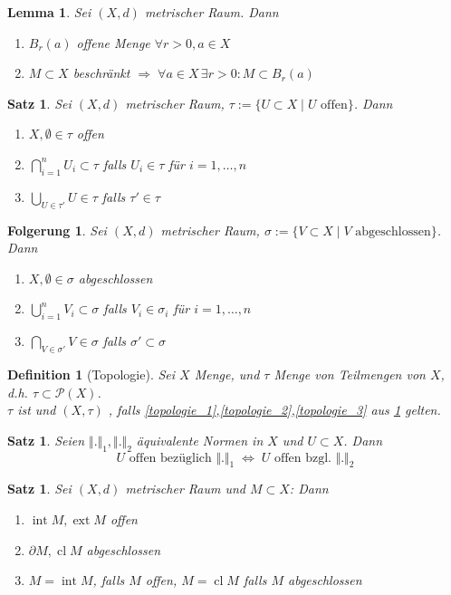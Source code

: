 \documentclass[ngerman,a4paper]{report}
\theoremstyle{break}
\newtheorem{lemma}[theorem]{Lemma}
\newtheorem{satz}[theorem]{Satz}
\newtheorem*{definition}{Definition}
\newtheorem{conclusion}[theorem]{Folgerung}
\DeclareMathOperator{\Int}{int}
\DeclareMathOperator{\Ext}{ext}
\DeclareMathOperator{\cl}{cl}
\begin{document}
\begin{lemma}
	Sei $(X,d)$ metrischer Raum. Dann
	\begin{enumerate}[label={\arabic*)}]
		\item $B_r(a)$ offene Menge $\forall r>0,a\in X$
		\item $M\subset X$ beschränkt $\Rightarrow\; \forall a\in X\,\exists r>0: M\subset B_r(a)$
	\end{enumerate}
\end{lemma}

\begin{satz}\label{satz_topologie}
	Sei $(X,d)$ metrischer Raum, $\tau:=\{U\subset X \mid U \text{ offen}\}$. Dann
	\begin{enumerate}[label={\arabic*)}]
		\item \label{topologie_1} $X,\emptyset\in \tau$ offen
		\item \label{topologie_2} $\bigcap_{i=1}^n U_i\subset \tau$ falls $U_i\in\tau$ für $i=1,\dotsc,n$
		\item \label{topologie_3} $\bigcup_{U\in\tau'} U\in\tau$ falls $\tau'\in\tau$ 
	\end{enumerate}
\end{satz}
\begin{conclusion}
	Sei $(X,d)$ metrischer Raum, $\sigma :=\{ V\subset X \mid  V \text{ abgeschlossen}\}$. Dann
	\begin{enumerate}[label={\arabic*)}]
		\item $X,\emptyset \in \sigma$ abgeschlossen
		\item $\bigcup_{i=1}^n V_i\subset\sigma$ falls $V_i\in\sigma_i$ für $i=1,\dotsc, n$
		\item $\bigcap_{V\in\sigma'} V\in\sigma$ falls $\sigma'\subset\sigma$
	\end{enumerate}
\end{conclusion}

\begin{definition}[Topologie]
	Sei $X$ Menge, und $\tau$ Menge von Teilmengen von $X$, d.h. $\tau\subset\mathcal{P}(X)$.\\
	$\tau$ ist  und $(X,\tau)$ , falls \ref{topologie_1},\ref{topologie_2},\ref{topologie_3} aus \ref{satz_topologie} gelten.
\end{definition}
\begin{satz}
	Seien $\Vert.\Vert_1, \Vert.\Vert_2$ äquivalente Normen in $X$ und $U\subset X$. Dann \[ U\text{ offen bezüglich } \Vert .\Vert_1\; \Leftrightarrow\; U\text{ offen bzgl. } \Vert .\Vert_2 \]
\end{satz}
\begin{satz}
	Sei $(X,d)$ metrischer Raum und $M\subset X$: Dann
	\begin{enumerate}[label={\arabic*)}]
		\item $\Int M, \Ext M$ offen
		\item $\partial M, \cl M$ abgeschlossen
		\item $M = \Int M$, falls $M$ offen, $M=\cl M$ falls $M$ abgeschlossen
	\end{enumerate}
\end{satz}
\end{document}
